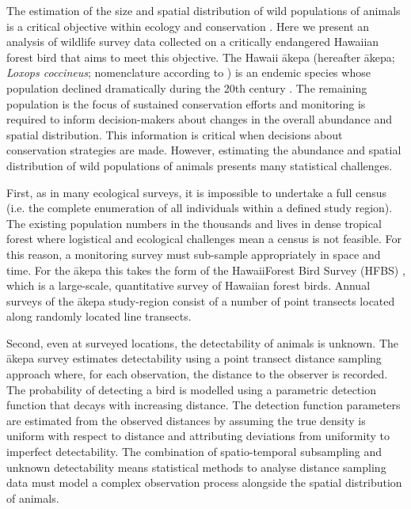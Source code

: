\documentclass{stylefile16/statsoc}
\newcommand{\akepa}{\textquotesingle\={a}kepa}  %
\newcommand{\hawaii}{Hawai\textquotesingle i}   %
\begin{document}
The estimation of the size and spatial distribution of wild populations of animals is a critical objective within ecology and conservation \citep{schwarz_estimating_1999}. Here we present an analysis of wildlife survey data collected on a critically endangered \hawaii{}an forest bird that aims to meet this objective.  The \hawaii{} \akepa{} (hereafter \akepa{}; \textit{Loxops coccineus}; nomenclature according to \citealp{usfws_akepa_1970}) is an endemic species whose population declined dramatically during the 20th century  \citep{usfws_revised_2006, judge_akepa_2018}.  The remaining population is the focus of sustained conservation efforts and monitoring is required to inform decision-makers about changes in the overall abundance and spatial distribution.  This information is critical when decisions about conservation strategies are made.  However, estimating the abundance and spatial distribution of wild populations of animals presents many statistical challenges.

First, as in many ecological surveys, it is impossible to undertake a full census (i.e. the complete enumeration of all individuals within a defined study region).  The existing population numbers in the thousands and lives in dense tropical forest where logistical and ecological challenges mean a census is not feasible.  For this reason, a monitoring survey must sub-sample appropriately in space and time.  For the \akepa{} this takes the form of the \hawaii Forest Bird Survey (HFBS) \citep{scott_HFBS_1986}, which is a large-scale, quantitative survey of Hawaiian forest birds.  Annual surveys of the \akepa{} study-region consist of a number of point transects located along randomly located line transects.

Second, even at surveyed locations, the detectability of animals is unknown.  The \akepa{} survey estimates detectability using a point transect distance sampling approach \citep{buckland_distance_2015} where, for each observation, the distance to the observer is recorded.  The probability of detecting a bird is modelled using a parametric detection function that decays with increasing distance.  The detection function parameters are estimated from the observed distances by assuming the true density is uniform with respect to distance and attributing deviations from uniformity to imperfect detectability. The combination of spatio-temporal subsampling and unknown detectability means statistical methods to analyse distance sampling data must model a complex observation process alongside the spatial distribution of animals.  
\end{document}

